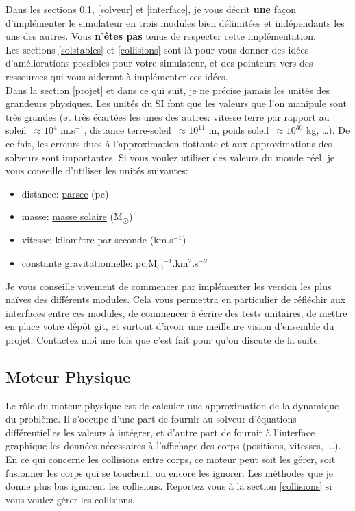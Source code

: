 \documentclass{article}
\begin{document}
Dans les sections \ref{moteurphysique}, \ref{solveur} et \ref{interface}, je vous décrit \textbf{une} façon d'implémenter le simulateur en trois modules bien délimitées et indépendants les uns des autres. Vous \textbf{n'êtes pas} tenus de respecter cette implémentation. \\
Les sections \ref{solstables} et \ref{collisions} sont là pour vous donner des idées d'améliorations possibles  pour votre simulateur, et des pointeurs vers des ressources qui vous aideront à implémenter ces idées. \\
Dans la section \ref{projet} et dans ce qui suit, je ne précise jamais les unités des grandeurs physiques. Les unités du SI font que les valeurs que l'on manipule sont très grandes (et très écartées les unes des autres: vitesse terre par rapport au soleil~${\approx 10^4}$ m.s$^{-1}$, distance terre-soleil~${\approx 10^{11}}$ m, poids soleil~${\approx 10^{30}}$ kg, \dots). De ce fait, les erreurs dues à l'approximation flottante et aux approximations des solveurs sont importantes. Si vous voulez utiliser des valeurs du monde réel, je vous conseille d'utiliser les unités suivantes:
\begin{itemize}
    \item distance: \href{https://en.wikipedia.org/wiki/Parsec}{parsec} (pc)
    \item masse: \href{https://en.wikipedia.org/wiki/Solar_mass}{masse solaire} (M\textsubscript{\(\odot\)})
    \item vitesse: kilomètre par seconde (km.s$^{-1}$)
    \item constante gravitationnelle: pc.M\textsubscript{\(\odot\)}$^{-1}$.km$^2$.s$^{-2}$
\end{itemize}

Je vous conseille vivement de commencer par implémenter les version les plus naïves des différents modules. Cela vous permettra en particulier de réfléchir aux interfaces entre ces modules, de commencer à écrire des tests unitaires, de mettre en place votre dépôt git, et surtout d'avoir une meilleure vision d'ensemble du projet. Contactez moi une fois que c'est fait pour qu'on discute de la suite.

\subsection{Moteur Physique}
\label{moteurphysique}

Le rôle du moteur physique est de calculer une approximation de la dynamique du problème. Il s'occupe d'une part de fournir au solveur d'équations différentielles les valeurs à intégrer, et d'autre part de fournir à l'interface graphique les données nécessaires à l'affichage des corps (positions, vitesses, ...). \\
En ce qui concerne les collisions entre corps, ce moteur peut soit les gérer, soit fusionner les corps qui se touchent, ou encore les ignorer. Les méthodes que je donne plus bas ignorent les collisions. Reportez vous à la section \ref{collisions} si vous voulez gérer les collisions.
\end{document}
